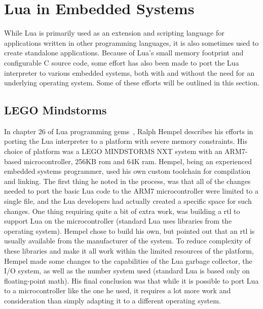 \section{Lua in Embedded Systems}
\label{sec:lua_in_embedded}
While Lua is primarily used as an extension and scripting language for applications written in other programming languages, it is also sometimes used to create standalone applications. Because of Lua's small memory footprint and configurable C source code, some effort has also been made to port the Lua interpreter to various embedded systems, both with and without the need for an underlying operating system. Some of these efforts will be outlined in this section.

\subsection{LEGO Mindstorms}
\label{sec:lego_mindstorms}
In chapter 26 of \guillemotleft Lua programming gems\guillemotright~\cite{chapter:porting_lua_microcontroller}, Ralph Hempel describes his efforts in porting the Lua interpreter to a platform with severe memory constraints. His choice of platform was a LEGO MINDSTORMS NXT system with an ARM7-based microcontroller, 256KB \gls{rom} and 64K \gls{ram}. Hempel, being an experienced embedded systems programmer, used his own custom toolchain for compilation and linking. The first thing he noted in the process, was that all of the changes needed to port the basic Lua code to the ARM7 microcontroller were limited to a single file, and the Lua developers had actually created a specific space for such changes. One thing requiring quite a bit of extra work, was building a \gls{rtl} to support Lua on the microcontroller (standard Lua uses libraries from the operating system). Hempel chose to build his own, but pointed out that an \gls{rtl} is usually available from the manufacturer of the system. To reduce complexity of these libraries and make it all work within the limited resources of the platform, Hempel made some changes to the capabilities of the Lua garbage collector, the I/O system, as well as the number system used (standard Lua is based only on floating-point math). His final conclusion was that while it is possible to port Lua to a microcontroller like the one he used, it requires a lot more work and consideration than simply adapting it to a different operating system.

